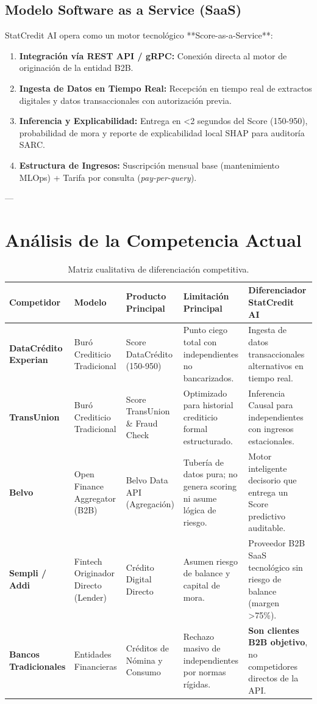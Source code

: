 \documentclass[11pt,a4paper]{article}
\begin{document}
\subsection{Modelo Software as a Service (SaaS)}
StatCredit AI opera como un motor tecnológico **Score-as-a-Service**:
\begin{enumerate}
    \item \textbf{Integración vía REST API / gRPC:} Conexión directa al motor de originación de la entidad B2B.
    \item \textbf{Ingesta de Datos en Tiempo Real:} Recepción en tiempo real de extractos digitales y datos transaccionales con autorización previa.
    \item \textbf{Inferencia y Explicabilidad:} Entrega en <2 segundos del Score (150-950), probabilidad de mora y reporte de explicabilidad local SHAP para auditoría SARC.
    \item \textbf{Estructura de Ingresos:} Suscripción mensual base (mantenimiento MLOps) + Tarifa por consulta (\textit{pay-per-query}).
\end{enumerate}

---

\section{Análisis de la Competencia Actual}

\begin{table}[h!]
\centering
\tiny
\begin{tabular}{p{2.2cm} p{2.2cm} p{2.8cm} p{2.5cm} p{3.2cm}}
\toprule
\textbf{Competidor} & \textbf{Modelo} & \textbf{Producto Principal} & \textbf{Limitación Principal} & \textbf{Diferenciador StatCredit AI} \\
\midrule
\textbf{DataCrédito Experian} & Buró Crediticio Tradicional & Score DataCrédito (150-950) & Punto ciego total con independientes no bancarizados. & Ingesta de datos transaccionales alternativos en tiempo real. \\
\midrule
\textbf{TransUnion} & Buró Crediticio Tradicional & Score TransUnion \& Fraud Check & Optimizado para historial crediticio formal estructurado. & Inferencia Causal para independientes con ingresos estacionales. \\
\midrule
\textbf{Belvo} & Open Finance Aggregator (B2B) & Belvo Data API (Agregación) & Tubería de datos pura; no genera scoring ni asume lógica de riesgo. & Motor inteligente decisorio que entrega un Score predictivo auditable. \\
\midrule
\textbf{Sempli / Addi} & Fintech Originador Directo (Lender) & Crédito Digital Directo & Asumen riesgo de balance y capital de mora. & Proveedor B2B SaaS tecnológico sin riesgo de balance (margen >75\%). \\
\midrule
\textbf{Bancos Tradicionales} & Entidades Financieras & Créditos de Nómina y Consumo & Rechazo masivo de independientes por normas rígidas. & \textbf{Son clientes B2B objetivo}, no competidores directos de la API. \\
\bottomrule
\end{tabular}
\caption{Matriz cualitativa de diferenciación competitiva.}
\end{table}
\end{document}
